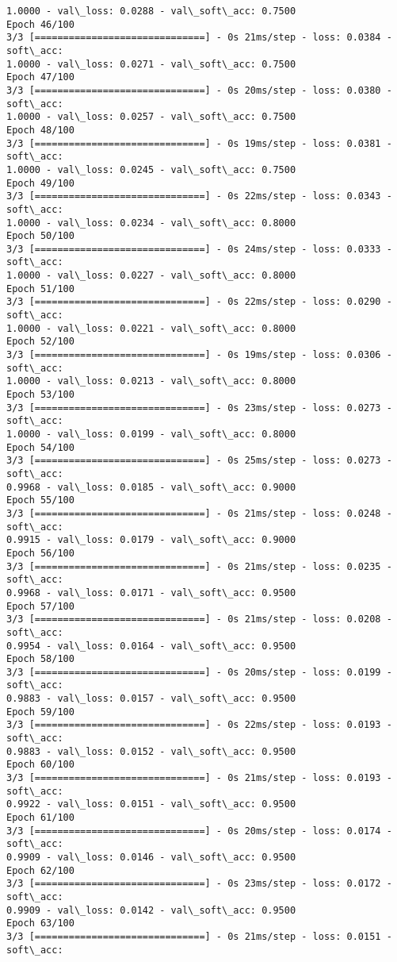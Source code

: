 \documentclass[11pt]{article}
\begin{document}
\begin{Verbatim}[commandchars=\\\{\}]
1.0000 - val\_loss: 0.0288 - val\_soft\_acc: 0.7500
Epoch 46/100
3/3 [==============================] - 0s 21ms/step - loss: 0.0384 - soft\_acc:
1.0000 - val\_loss: 0.0271 - val\_soft\_acc: 0.7500
Epoch 47/100
3/3 [==============================] - 0s 20ms/step - loss: 0.0380 - soft\_acc:
1.0000 - val\_loss: 0.0257 - val\_soft\_acc: 0.7500
Epoch 48/100
3/3 [==============================] - 0s 19ms/step - loss: 0.0381 - soft\_acc:
1.0000 - val\_loss: 0.0245 - val\_soft\_acc: 0.7500
Epoch 49/100
3/3 [==============================] - 0s 22ms/step - loss: 0.0343 - soft\_acc:
1.0000 - val\_loss: 0.0234 - val\_soft\_acc: 0.8000
Epoch 50/100
3/3 [==============================] - 0s 24ms/step - loss: 0.0333 - soft\_acc:
1.0000 - val\_loss: 0.0227 - val\_soft\_acc: 0.8000
Epoch 51/100
3/3 [==============================] - 0s 22ms/step - loss: 0.0290 - soft\_acc:
1.0000 - val\_loss: 0.0221 - val\_soft\_acc: 0.8000
Epoch 52/100
3/3 [==============================] - 0s 19ms/step - loss: 0.0306 - soft\_acc:
1.0000 - val\_loss: 0.0213 - val\_soft\_acc: 0.8000
Epoch 53/100
3/3 [==============================] - 0s 23ms/step - loss: 0.0273 - soft\_acc:
1.0000 - val\_loss: 0.0199 - val\_soft\_acc: 0.8000
Epoch 54/100
3/3 [==============================] - 0s 25ms/step - loss: 0.0273 - soft\_acc:
0.9968 - val\_loss: 0.0185 - val\_soft\_acc: 0.9000
Epoch 55/100
3/3 [==============================] - 0s 21ms/step - loss: 0.0248 - soft\_acc:
0.9915 - val\_loss: 0.0179 - val\_soft\_acc: 0.9000
Epoch 56/100
3/3 [==============================] - 0s 21ms/step - loss: 0.0235 - soft\_acc:
0.9968 - val\_loss: 0.0171 - val\_soft\_acc: 0.9500
Epoch 57/100
3/3 [==============================] - 0s 21ms/step - loss: 0.0208 - soft\_acc:
0.9954 - val\_loss: 0.0164 - val\_soft\_acc: 0.9500
Epoch 58/100
3/3 [==============================] - 0s 20ms/step - loss: 0.0199 - soft\_acc:
0.9883 - val\_loss: 0.0157 - val\_soft\_acc: 0.9500
Epoch 59/100
3/3 [==============================] - 0s 22ms/step - loss: 0.0193 - soft\_acc:
0.9883 - val\_loss: 0.0152 - val\_soft\_acc: 0.9500
Epoch 60/100
3/3 [==============================] - 0s 21ms/step - loss: 0.0193 - soft\_acc:
0.9922 - val\_loss: 0.0151 - val\_soft\_acc: 0.9500
Epoch 61/100
3/3 [==============================] - 0s 20ms/step - loss: 0.0174 - soft\_acc:
0.9909 - val\_loss: 0.0146 - val\_soft\_acc: 0.9500
Epoch 62/100
3/3 [==============================] - 0s 23ms/step - loss: 0.0172 - soft\_acc:
0.9909 - val\_loss: 0.0142 - val\_soft\_acc: 0.9500
Epoch 63/100
3/3 [==============================] - 0s 21ms/step - loss: 0.0151 - soft\_acc:

\end{Verbatim}
\end{document}
